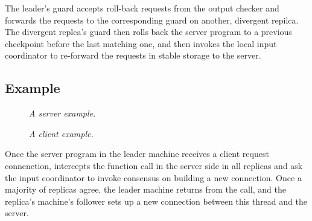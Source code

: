 The leader's guard accepts roll-back requests from the output checker and 
forwards the requests to the corresponding guard on another, divergent repilca. 
The divergent replca's guard then rolls back the server program to a previous 
checkpoint before the last matching one, and then invokes the local input 
coordinator to re-forward the requests in stable storage to the server.


\subsection{Example}\label{sec:example}

\begin{figure}[t]
\centering
\begin{minipage}{.5\textwidth}
\end{minipage}
\vspace{-.1in}
\caption{{\em A server example.}} \label{fig:example}
\vspace{-.20in}
\end{figure}

\begin{figure}[t]
\centering
\begin{minipage}{.5\textwidth}
\end{minipage}
\vspace{-.1in}
\caption{{\em A client example.}} \label{fig:client}
\vspace{-.05in}
\end{figure}



Once the server program in the leader machine receives a client request 
connenction, \xxx intercepts the \accept function call in the server side in 
all replicas and ask the input coordinator to invoke consensus on building a 
new connection. Once a majority of replicas agree, the leader machine returns 
from the \accept call, and the replica's machine's follower sets up a new
connection between this thread and the server.

